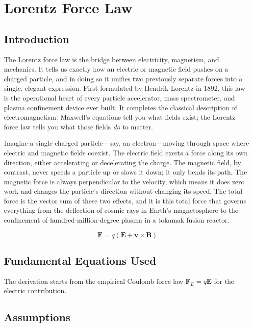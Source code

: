 \chapter{Lorentz Force Law}

\section*{Introduction}

The Lorentz force law is the bridge between electricity, magnetism, and mechanics. It tells us exactly how an electric or magnetic field pushes on a charged particle, and in doing so it unifies two previously separate forces into a single, elegant expression. First formulated by Hendrik Lorentz in 1892, this law is the operational heart of every particle accelerator, mass spectrometer, and plasma confinement device ever built. It completes the classical description of electromagnetism: Maxwell's equations tell you what fields exist; the Lorentz force law tells you what those fields \emph{do} to matter.

Imagine a single charged particle---say, an electron---moving through space where electric and magnetic fields coexist. The electric field exerts a force along its own direction, either accelerating or decelerating the charge. The magnetic field, by contrast, never speeds a particle up or slows it down; it only bends its path. The magnetic force is always perpendicular to the velocity, which means it does zero work and changes the particle's direction without changing its speed. The total force is the vector sum of these two effects, and it is this total force that governs everything from the deflection of cosmic rays in Earth's magnetosphere to the confinement of hundred-million-degree plasma in a tokamak fusion reactor.


\begin{equation}
\mathbf{F} = q\!\left(\mathbf{E} + \mathbf{v} \times \mathbf{B}\right)
\end{equation}

\section*{Fundamental Equations Used}

The derivation starts from the empirical Coulomb force law $\mathbf{F}_E = q\mathbf{E}$ for the electric contribution.

\section*{Assumptions}

